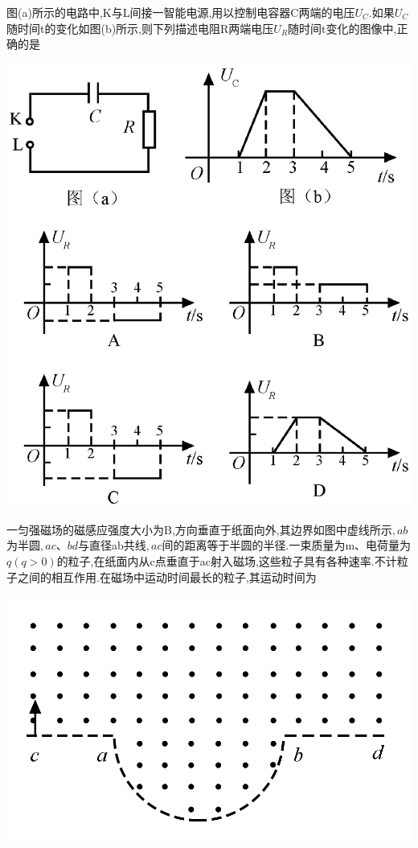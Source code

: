 \question[6]图(a)所示的电路中,K与L间接一智能电源,用以控制电容器C两端的电压$U_C.$如果$U_C$随时间t的变化如图(b)所示,则下列描述电阻R两端电压$U_R$随时间t变化的图像中,正确的是
\begin{center}
\includegraphics[]{img/image2.png}
\end{center}

\begin{solution}{4cm}

\end{solution}



\question[6]一匀强磁场的磁感应强度大小为B,方向垂直于纸面向外,其边界如图中虚线所示$,ab$为半圆$,ac、bd$与直径ab共线$,ac$间的距离等于半圆的半径.一束质量为m、电荷量为$q(q>0)$的粒子,在纸面内从c点垂直于ac射入磁场,这些粒子具有各种速率.不计粒子之间的相互作用.在磁场中运动时间最长的粒子,其运动时间为
\begin{center}
\includegraphics[]{img/image3.png}
\end{center}

